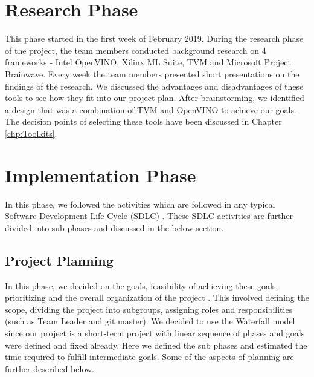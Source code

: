 \section{Research Phase}
 
This phase started in the first week of February 2019. During the research phase of the project, the team members conducted background research on 4 frameworks - Intel OpenVINO, Xilinx ML Suite, TVM and Microsoft Project Brainwave. Every week the team members presented short presentations on the findings of the research. We discussed the advantages and disadvantages of these tools to see how they fit into our project plan. After brainstorming, we identified a design that was a combination of TVM and OpenVINO to achieve our goals. The decision points of selecting these tools have been discussed in Chapter \ref{chp:Toolkits}.

\section{Implementation Phase}
In this phase, we followed the activities which are followed in any typical Software Development Life Cycle (SDLC) . These SDLC activities are further divided into sub phases and discussed in the below section. 
\subsection{Project Planning}

In this phase, we decided on the goals, feasibility of achieving these goals, prioritizing and the overall organization of the project . This involved defining the scope, dividing the project into subgroups, assigning roles and responsibilities (such as Team Leader and git master). We decided to use the Waterfall model since our project is a short-term project with linear sequence of phases and goals were defined and fixed already. Here we defined the sub phases and estimated the time required to fulfill intermediate goals. Some of the aspects of planning are further described  below. 

